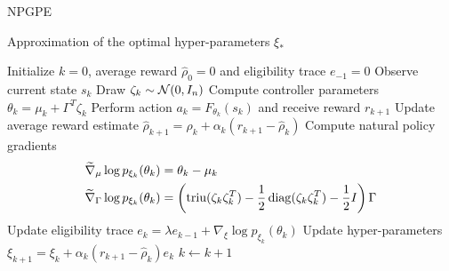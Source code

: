 \begin{algorithm}[t!]
	\caption{NPGPE}
	\label{algo:NPGPE}
	\begin{algorithmic}[0]
		\Ensure Approximation of the optimal hyper-parameters $\xi_*$
		\begin{algorithmic}[1]
		\State Initialize $k = 0$, average reward $\widehat{\rho}_0 = 0$ and eligibility trace $e_{-1} = 0$
		\Repeat
			\State Observe current state $s_k$
			\State Draw $\zeta_k \sim \mathcal{N}(0, I_n)$
			\State Compute controller parameters $\theta_k = \mu_k + \Gamma^T \zeta_k$
			\State Perform action $a_k = F_{\theta_k}(s_k)$ and receive reward $r_{k+1}$
			\State Update average reward estimate $\widehat{\rho}_{k+1} = \widehat{\rho}_{k} + \alpha_k (r_{k+1} - \widehat{\rho}_{k})$
			\State Compute natural policy gradients
				\begin{equation*}
					\begin{split}
						\widetilde{\nabla}_\mu \log p_{\xi_k}(\theta_k) &= \theta_k - \mu_k\\
						\widetilde{\nabla}_\Gamma \log p_{\xi_k}(\theta_k) &= \left(\operatorname{triu}(\zeta_k \zeta_k^T) - \frac{1}{2} \operatorname{diag}(\zeta_k \zeta_k^T) - \frac{1}{2} I \right) \Gamma
					\end{split}
				\end{equation*}
			\State Update eligibility trace $e_{k} = \lambda e_{k-1} + \nabla_\xi \log p_{\xi_k}(\theta_k)$
			\State Update hyper-parameters $\xi_{k+1} = \xi_k + \alpha_k (r_{k+1} - \widehat{\rho}_{k}) e_k$
			\State $k \leftarrow k + 1$
		\end{algorithmic}
	\end{algorithmic}
\end{algorithm}  

